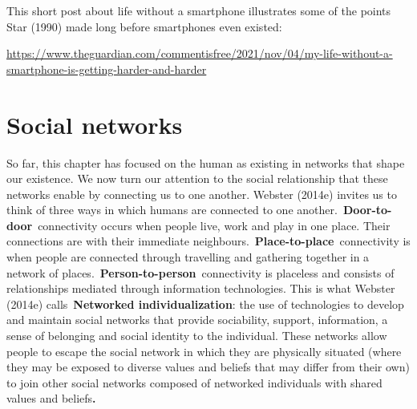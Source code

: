 \documentclass[
  letterpaper,
  DIV=11,
  numbers=noendperiod]{scrreprt}
\begin{document}
\begin{tcolorbox}[enhanced jigsaw, arc=.35mm, bottomrule=.15mm, bottomtitle=1mm, breakable, colback=white, colbacktitle=quarto-callout-note-color!10!white, colframe=quarto-callout-note-color-frame, coltitle=black, left=2mm, leftrule=.75mm, opacityback=0, opacitybacktitle=0.6, rightrule=.15mm, title=\textcolor{quarto-callout-note-color}{\faInfo}\hspace{0.5em}{Suggesting reading}, titlerule=0mm, toprule=.15mm, toptitle=1mm]

This short post about life without a smartphone illustrates some of the
points Star (1990) made long before smartphones even existed:

\url{https://www.theguardian.com/commentisfree/2021/nov/04/my-life-without-a-smartphone-is-getting-harder-and-harder}

\end{tcolorbox}

\section{Social networks}\label{social-networks}

So far, this chapter has focused on the human as existing in networks
that shape our existence. We now turn our attention to the social
relationship that these networks enable by connecting us to one another.
Webster (2014e) invites us to think of three ways in which humans are
connected to one another.~\textbf{Door-to-door}~connectivity occurs when
people live, work and play in one place. Their connections are with
their immediate neighbours.~\textbf{Place-to-place}~connectivity is when
people are connected through travelling and gathering together in a
network of places.~\textbf{Person-to-person}~connectivity is placeless
and consists of relationships mediated through information technologies.
This is what Webster (2014e) calls~\textbf{Networked individualization}:
the use of technologies to develop and maintain social networks that
provide sociability, support, information, a sense of belonging and
social identity to the individual. These networks allow people to escape
the social network in which they are physically situated (where they may
be exposed to diverse values and beliefs that may differ from their own)
to join other social networks composed of networked individuals with
shared values and beliefs\textbf{.}
\end{document}
